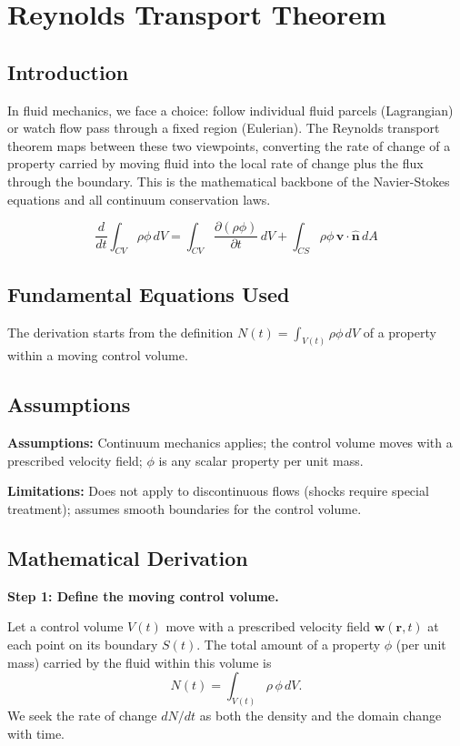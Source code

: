 \chapter{Reynolds Transport Theorem}

\section*{Introduction}

In fluid mechanics, we face a choice: follow individual fluid parcels (Lagrangian) or watch flow pass through a fixed region (Eulerian). The Reynolds transport theorem maps between these two viewpoints, converting the rate of change of a property carried by moving fluid into the local rate of change plus the flux through the boundary. This is the mathematical backbone of the Navier-Stokes equations and all continuum conservation laws.


\begin{equation}
\frac{d}{dt}\int_{CV} \rho\phi\, dV = \int_{CV} \frac{\partial(\rho\phi)}{\partial t}\, dV + \int_{CS} \rho\phi\,\mathbf{v}\cdot\hat{\mathbf{n}}\, dA
\end{equation}

\section*{Fundamental Equations Used}

The derivation starts from the definition $N(t) = \int_{V(t)} \rho\phi\,dV$ of a property within a moving control volume.

\section*{Assumptions}

\textbf{Assumptions:} Continuum mechanics applies; the control volume moves with a prescribed velocity field; $\phi$ is any scalar property per unit mass.


\textbf{Limitations:} Does not apply to discontinuous flows (shocks require special treatment); assumes smooth boundaries for the control volume.


\section*{Mathematical Derivation}

\textbf{Step 1: Define the moving control volume.}

Let a control volume $V(t)$ move with a prescribed velocity field $\mathbf{w}(\mathbf{r},t)$ at each point on its boundary $S(t)$. The total amount of a property $\phi$ (per unit mass) carried by the fluid within this volume is
\begin{equation}
N(t) = \int_{V(t)} \rho\,\phi\,dV.
\end{equation}
We seek the rate of change $dN/dt$ as both the density and the domain change with time.

